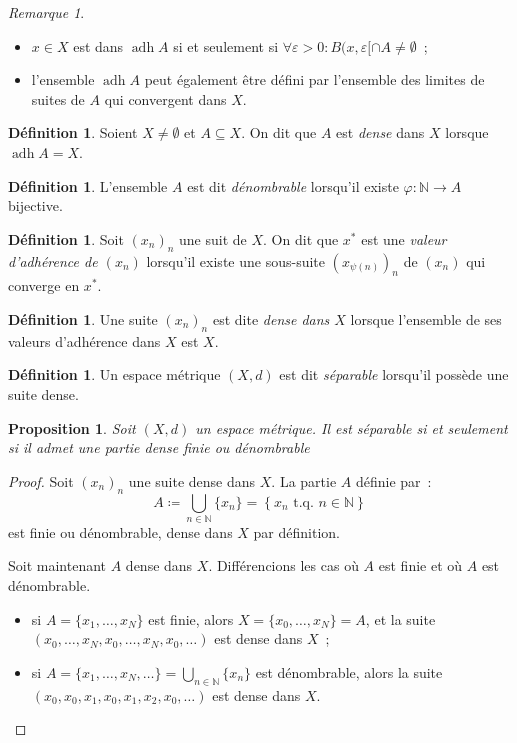 \documentclass{report}
\newtheorem{prp}[thm]{Proposition}
\theoremstyle{definition}
\newtheorem{déf}[thm]{Définition}
\theoremstyle{remark}
\newtheorem*{rmq}{Remarque}
\numberwithin{equation}{section}
\newcommand{\N}{\mathbb N}
\newcommand{\tq}{\text{ t.q. }}
\DeclareMathOperator{\adh}{adh}
\begin{document}
			\begin{rmq}~
			\begin{itemize}
				\item $x \in X$ est dans $\adh A$ si et seulement si $\forall \varepsilon > 0 : B(x, \varepsilon[ \cap A \neq \emptyset$~;
				\item l'ensemble $\adh A$ peut également être défini par l'ensemble des limites de suites de $A$ qui convergent dans $X$.
			\end{itemize}
			\end{rmq}

			\begin{déf} Soient $X \neq \emptyset$ et $A \subseteq X$. On dit que $A$ est \textit{dense} dans $X$ lorsque $\adh A = X$.
			\end{déf}

			\begin{déf} L'ensemble $A$ est dit \textit{dénombrable} lorsqu'il existe $\varphi : \N \to A$ bijective.
			\end{déf}

			\begin{déf} Soit $(x_n)_n$ une suit de $X$. On dit que $x^*$ est une \textit{valeur d'adhérence de $(x_n)$} lorsqu'il existe une sous-suite
			$(x_{\psi(n)})_n$ de $(x_n)$ qui converge en $x^*$.
			\end{déf}

			\begin{déf}Une suite $(x_n)_n$ est dite \textit{dense dans $X$} lorsque l'ensemble de ses valeurs d'adhérence dans $X$ est $X$.
			\end{déf}

			\begin{déf} Un espace métrique $(X, d)$ est dit \textit{séparable} lorsqu'il possède une suite dense.
			\end{déf}

			\begin{prp} Soit $(X, d)$ un espace métrique. Il est séparable si et seulement si il admet une partie dense finie ou dénombrable
			\end{prp}

			\begin{proof} Soit $(x_n)_n$ une suite dense dans $X$. La partie $A$ définie par~:
			\begin{equation}
				A \coloneqq \bigcup_{n \in \N}\{x_n\} = \left\{x_n \tq n \in \N\right\}
			\end{equation}
			est finie ou dénombrable, dense dans $X$ par définition.

			Soit maintenant $A$ dense dans $X$. Différencions les cas où $A$ est finie et où $A$ est dénombrable.
			\begin{itemize}
				\item si $A = \{x_1, \ldots, x_N\}$ est finie, alors $X = \{x_0, \ldots, x_N\} = A$, et la suite $(x_0, \ldots, x_N, x_0, \ldots, x_N, x_0, \ldots)$
				est dense dans $X$~;
				\item si $A = \{x_1, \ldots, x_N, \ldots\} = \bigcup_{n \in \N}\{x_n\}$ est dénombrable, alors la suite $(x_0, x_0, x_1, x_0, x_1, x_2, x_0, \ldots)$
				est dense dans $X$.
			\end{itemize}
			\end{proof}
\end{document}
